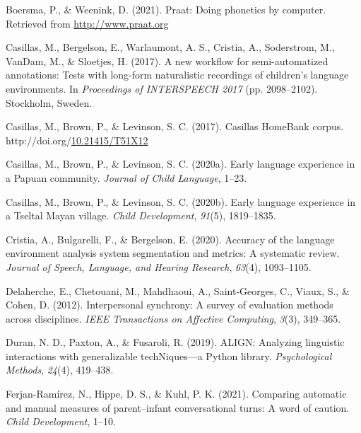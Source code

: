 \documentclass[10pt, letterpaper]{article}
\newenvironment{CSLReferences}%
  {}%
  {\par}
\begin{document}
\hypertarget{refs}{}
\begin{CSLReferences}{1}{0}
\leavevmode\hypertarget{ref-PRAAT}{}%
Boersma, P., \& Weenink, D. (2021). Praat: Doing phonetics by computer.
Retrieved from \url{http://www.praat.org}

\leavevmode\hypertarget{ref-casillas2017workflow}{}%
Casillas, M., Bergelson, E., Warlaumont, A. S., Cristia, A., Soderstrom,
M., VanDam, M., \& Sloetjes, H. (2017). A new workflow for
semi-automatized annotations: Tests with long-form naturalistic
recordings of children's language environments. In \emph{Proceedings of
{INTERSPEECH} 2017} (pp. 2098--2102). Stockholm, Sweden.

\leavevmode\hypertarget{ref-Casillas-HB}{}%
Casillas, M., Brown, P., \& Levinson, S. C. (2017). Casillas {HomeBank}
corpus.
http://doi.org/\href{https://doi.org/10.21415/T51X12}{10.21415/T51X12}

\leavevmode\hypertarget{ref-casillas2020rossel}{}%
Casillas, M., Brown, P., \& Levinson, S. C. (2020a). Early language
experience in a {P}apuan community. \emph{Journal of Child Language},
1--23.

\leavevmode\hypertarget{ref-casillas2020tseltal}{}%
Casillas, M., Brown, P., \& Levinson, S. C. (2020b). Early language
experience in a {Tseltal Mayan} village. \emph{Child Development},
\emph{91}(5), 1819--1835.

\leavevmode\hypertarget{ref-cristia2020accuracy}{}%
Cristia, A., Bulgarelli, F., \& Bergelson, E. (2020). Accuracy of the
language environment analysis system segmentation and metrics: A
systematic review. \emph{Journal of Speech, Language, and Hearing
Research}, \emph{63}(4), 1093--1105.

\leavevmode\hypertarget{ref-delaherche2012interpersonal}{}%
Delaherche, E., Chetouani, M., Mahdhaoui, A., Saint-Georges, C., Viaux,
S., \& Cohen, D. (2012). Interpersonal synchrony: A survey of evaluation
methods across disciplines. \emph{IEEE Transactions on Affective
Computing}, \emph{3}(3), 349--365.

\leavevmode\hypertarget{ref-duran2019align}{}%
Duran, N. D., Paxton, A., \& Fusaroli, R. (2019). ALIGN: Analyzing
linguistic interactions with generalizable techNiques---a {P}ython
library. \emph{Psychological Methods}, \emph{24}(4), 419--438.

\leavevmode\hypertarget{ref-ferjan2021comparing}{}%
Ferjan-Ramírez, N., Hippe, D. S., \& Kuhl, P. K. (2021). Comparing
automatic and manual measures of parent--infant conversational turns: A
word of caution. \emph{Child Development}, 1--10.


\end{CSLReferences}
\end{document}
